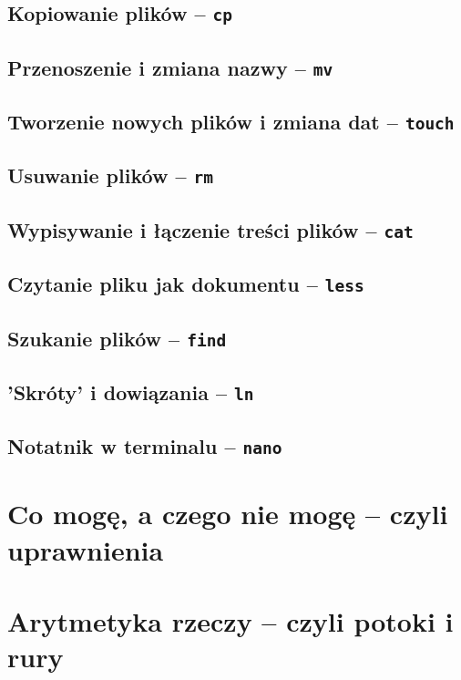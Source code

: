 \documentclass[12pt]{article}
\newcommand{\ttbf}[1]{
    \texttt{\textbf{#1}}
}
\begin{document}
\subsection{Kopiowanie plików -- \ttbf{cp}}

\subsection{Przenoszenie i zmiana nazwy -- \ttbf{mv}}

\subsection{Tworzenie nowych plików i zmiana dat -- \ttbf{touch}}

\subsection{Usuwanie plików -- \ttbf{rm}}

\subsection{Wypisywanie i łączenie treści plików -- \ttbf{cat}}

\subsection{Czytanie pliku jak dokumentu -- \ttbf{less}}

\subsection{Szukanie plików -- \ttbf{find}}

\subsection{'Skróty' i dowiązania -- \ttbf{ln}}

\subsection{Notatnik w terminalu -- \ttbf{nano}}

\section{Co mogę, a czego nie mogę -- czyli uprawnienia}
\label{sec:perms}

\section{Arytmetyka rzeczy -- czyli potoki i rury}
\end{document}
